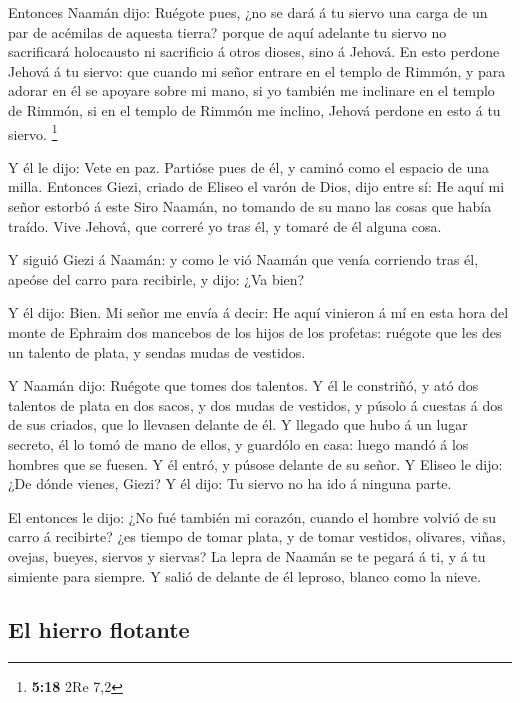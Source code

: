  Entonces Naamán dijo: Ruégote pues, ¿no se dará á tu
siervo una carga de un par de acémilas de aquesta tierra? porque de aquí
adelante tu siervo no sacrificará holocausto ni sacrificio á otros
dioses, sino á Jehová.  En esto perdone Jehová á tu
siervo: que cuando mi señor entrare en el templo de Rimmón, y para
adorar en él se apoyare sobre mi mano, si yo también me inclinare en el
templo de Rimmón, si en el templo de Rimmón me inclino, Jehová perdone
en esto á tu siervo. \footnote{\textbf{5:18} 2Re 7,2}

 Y él le dijo: Vete en paz. Partióse pues de él, y caminó
como el espacio de una milla.  Entonces Giezi, criado de
Eliseo el varón de Dios, dijo entre sí: He aquí mi señor estorbó á este
Siro Naamán, no tomando de su mano las cosas que había traído. Vive
Jehová, que correré yo tras él, y tomaré de él alguna cosa.

 Y siguió Giezi á Naamán: y como le vió Naamán que venía
corriendo tras él, apeóse del carro para recibirle, y dijo: ¿Va bien?

 Y él dijo: Bien. Mi señor me envía á decir: He aquí
vinieron á mí en esta hora del monte de Ephraim dos mancebos de los
hijos de los profetas: ruégote que les des un talento de plata, y sendas
mudas de vestidos.

 Y Naamán dijo: Ruégote que tomes dos talentos. Y él le
constriñó, y ató dos talentos de plata en dos sacos, y dos mudas de
vestidos, y púsolo á cuestas á dos de sus criados, que lo llevasen
delante de él.  Y llegado que hubo á un lugar secreto, él
lo tomó de mano de ellos, y guardólo en casa: luego mandó á los hombres
que se fuesen.  Y él entró, y púsose delante de su señor.
Y Eliseo le dijo: ¿De dónde vienes, Giezi? Y él dijo: Tu siervo no ha
ido á ninguna parte.

 El entonces le dijo: ¿No fué también mi corazón, cuando
el hombre volvió de su carro á recibirte? ¿es tiempo de tomar plata, y
de tomar vestidos, olivares, viñas, ovejas, bueyes, siervos y siervas?
 La lepra de Naamán se te pegará á ti, y á tu simiente
para siempre. Y salió de delante de él leproso, blanco como la nieve.

\hypertarget{el-hierro-flotante}{%
\subsection{El hierro flotante}\label{el-hierro-flotante}}

